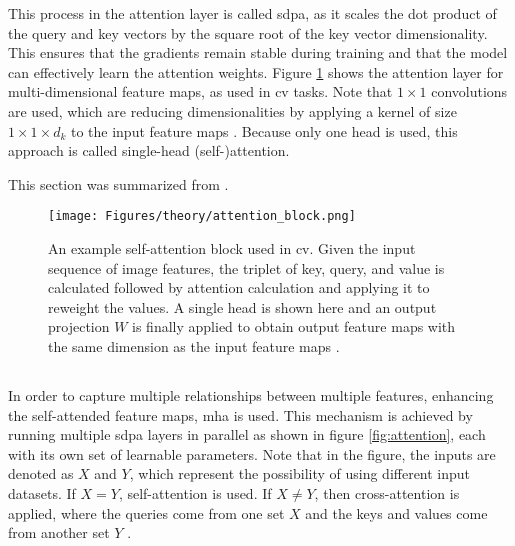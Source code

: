 This process in the attention layer is called \gls{sdpa}, as it scales the dot product of the query and key vectors by the square root of the key vector dimensionality. This ensures that the gradients remain stable during training and that the model can effectively learn the attention weights. Figure \ref{fig:self-attention} shows the attention layer for multi-dimensional feature maps, as used in \gls{cv} tasks. Note that \( 1 \times 1 \) convolutions are used, which are reducing dimensionalities by applying a kernel of size \( 1 \times 1 \times d_k \) to the input feature maps \autocite{Cordonnier.Loukas.ea2020,Pan.Ge.ea2022}. Because only one head is used, this approach is called single-head (self-)attention.

This section was summarized from \textcite{Bahdanau.Cho.ea2014,Brauwers.Frasincar2023,Han.Wang.ea2023,Khan.Naseer.ea2021,Liu.Zhang.ea2024,Szeliski2022,Vaswani.Shazeer.ea2017,Zhang.Lipton.ea2023}.

\begin{figure}[htb]
    \centering
    \texttt{[image: Figures/theory/attention\_block.png]}
    \caption[Self-Attention Block in ]{An example self-attention block used in \gls{cv}. Given the input sequence of image features, the triplet of key, query, and value is calculated followed by attention calculation and applying it to reweight the values. A single head is shown here and an output projection \( W \) is finally applied to obtain output feature maps with the same dimension as the input feature maps \autocite{Khan.Naseer.ea2021}.}
    \label{fig:self-attention}
\end{figure}

\subsection{}

In order to capture multiple relationships between multiple features, enhancing the self-attended feature maps, \gls{mha} is used. This mechanism is achieved by running multiple \gls{sdpa} layers in parallel as shown in figure \ref{fig:attention}, each with its own set of learnable parameters. Note that in the figure, the inputs are denoted as \( X \) and \( Y \), which represent the possibility of using different input datasets. If \(X = Y\), self-attention is used. If \(X \neq Y\), then cross-attention is applied, where the queries come from one set \(X\) and the keys and values come from another set \(Y\) \autocite{Bi.Zhu.ea2021,Khan.Naseer.ea2021,Liu.Zhang.ea2024}.

